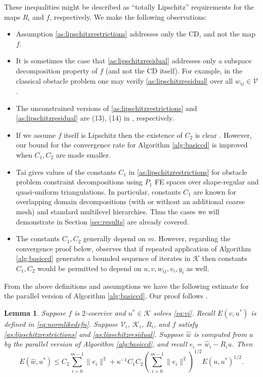 \documentclass[letterpaper,final,12pt,reqno]{amsart}
\theoremstyle{cstyle}
\newtheorem{lemma}[theorem]{Lemma}
\theoremstyle{cstyle*}
\theoremstyle{dstyle}
\numberwithin{equation}{section}
\numberwithin{figure}{section}
\numberwithin{table}{section}
\numberwithin{theorem}{section}
\newcommand{\cV}{\mathcal{V}}
\begin{document}
These inequalities might be described as ``totally Lipschitz'' requirements for the maps $R_i$ and $f$, respectively.  We make the following observations:
\begin{itemize}
\item Assumption \eqref{as:lipschitzrestrictions} addresses only the CD, and not the map $f$.
\item It is sometimes the case that \eqref{as:lipschitzresidual} addresses only a subspace decomposition property of $f$ (and not the CD itself).  For example, in the classical obstacle problem one may verify \eqref{as:lipschitzresidual} over all $w_{ij} \in \cV$.
\item The unconstrained versions of \eqref{as:lipschitzrestrictions} and \eqref{as:lipschitzresidual} are (13), (14) in \cite{TaiXu2002}, respectively.
\item If we assume $f$ itself is Lipschitz then the existence of $C_2$ is clear \cite{TaiXu2002}.  However, our bound for the convergence rate for Algorithm \ref{alg:basiccd} is improved when $C_1,C_2$ are made smaller.
\item Tai \cite{Tai2003} gives values of the constants $C_1$ in \eqref{as:lipschitzrestrictions} for obstacle problem constraint decompositions using $P_1$ FE spaces over shape-regular and quasi-uniform triangulations.  In particular, constants $C_1$ are known for overlapping domain decompositions (with or without an additional coarse mesh) and standard multilevel hierarchies.  Thus the cases we will demonstrate in Section \ref{sec:results} are already covered.
\item The constants $C_1,C_2$ generally depend on $m$.  However, regarding the convergence proof below, \cite{Tai2003} observes that if repeated application of Algorithm \ref{alg:basiccd} generates a bounded sequence of iterates in $\mathcal{K}$ then constants $C_1,C_2$ would be permitted to depend on $u,v,w_{ij},v_i,y_i$ as well.
\end{itemize}

From the above definitions and assumptions we have the following estimate for the parallel version of Algorithm \ref{alg:basiccd}.  Our proof follows \cite{Tai2003}.

\begin{lemma} \label{lem:core}  Suppose $f$ is $2$-coercive and $u^* \in \mathcal{K}$ solves \eqref{eq:vi}.  Recall $E(v,u^*)$ is defined in \eqref{eq:normlikedefn}.  Suppose $\mathcal{V}_i$, $\mathcal{K}_i$, $R_i$, and $f$ satisfy \eqref{as:lipschitzrestrictions} and \eqref{as:lipschitzresidual}.  Suppose $\hat w$ is computed from $u$ by the parallel version of Algorithm \ref{alg:basiccd}, and recall $e_i = \hat w_i - R_i u$.  Then
\begin{equation}
   E(\hat w,u^*) \le C_2 \sum_{i=0}^{m-1} \|e_i\|^2 + \kappa^{-1} C_1 C_2 \left(\sum_{i=0}^{m-1} \|e_i\|^2\right)^{1/2} E(u,u^*)^{1/2}. \label{eq:core}
\end{equation}
\end{lemma}
\end{document}
